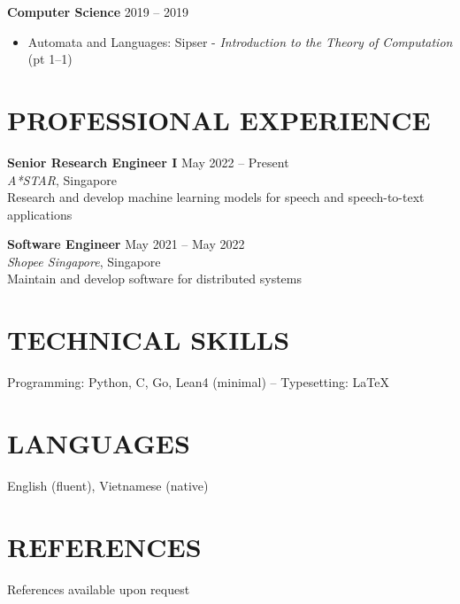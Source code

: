 \documentclass[11pt]{article}
\begin{document}
\textbf{Computer Science} \hfill 2019 -- 2019

\begin{itemize}[topsep=0pt, partopsep=0pt, itemsep=0pt, parsep=0pt]
	\item Automata and Languages: Sipser - \textit{Introduction to the Theory of Computation} (pt 1--1)
\end{itemize}

\vspace{-0.3cm}
\section{PROFESSIONAL EXPERIENCE}

\textbf{Senior Research Engineer I} \hfill May 2022 -- Present \\
\textit{A*STAR}, Singapore \\
Research and develop machine learning models for speech and speech-to-text applications

\textbf{Software Engineer} \hfill May 2021 -- May 2022 \\
\textit{Shopee Singapore}, Singapore \\
Maintain and develop software for distributed systems


\vspace{-0.3cm}
\section*{TECHNICAL SKILLS}

Programming: Python, C, Go, Lean4 (minimal) -- Typesetting: \LaTeX

\vspace{-0.3cm}
\section*{LANGUAGES}

English (fluent), Vietnamese (native)

\vspace{-0.3cm}
\section*{REFERENCES}

References available upon request
\end{document}
